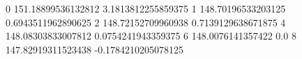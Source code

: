 0 151.18899536132812 3.1813812255859375
1 148.70196533203125 0.6943511962890625
2 148.72152709960938 0.7139129638671875
4 148.08303833007812 0.0754241943359375
6 148.0076141357422 0.0
8 147.82919311523438 -0.1784210205078125
